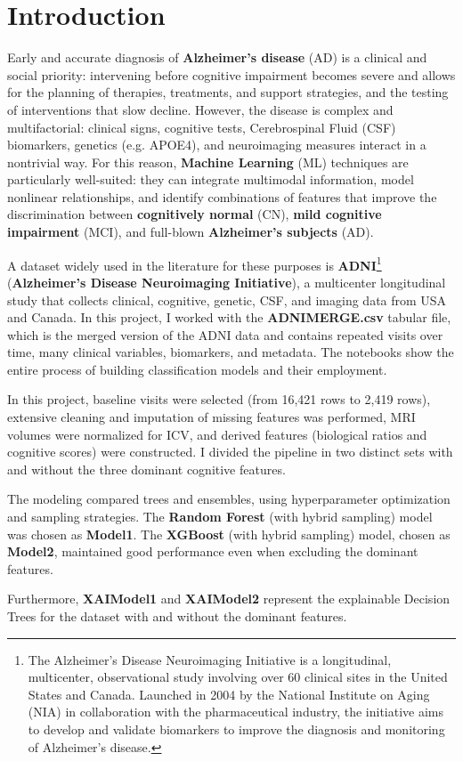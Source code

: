 \section{Introduction}
Early and accurate diagnosis of \textbf{Alzheimer's disease} (AD) is a clinical and social priority: intervening before cognitive impairment becomes severe and allows for the planning of therapies, treatments, and support strategies, and the testing of interventions that slow decline. However, the disease is complex and multifactorial: clinical signs, cognitive tests, Cerebrospinal Fluid (CSF) biomarkers, genetics (e.g. APOE4), and neuroimaging measures interact in a nontrivial way. For this reason, \textbf{Machine Learning} (ML) techniques are particularly well-suited: they can integrate multimodal information, model nonlinear relationships, and identify combinations of features that improve the discrimination between \textbf{cognitively normal} (CN), \textbf{mild cognitive impairment} (MCI), and full-blown \textbf{Alzheimer's subjects} (AD).

A dataset widely used in the literature for these purposes is \textbf{ADNI}\footnote{The Alzheimer's Disease Neuroimaging Initiative is a longitudinal, multicenter, observational study involving over 60 clinical sites in the United States and Canada. Launched in 2004 by the National Institute on Aging (NIA) in collaboration with the pharmaceutical industry, the initiative aims to develop and validate biomarkers to improve the diagnosis and monitoring of Alzheimer's disease.} (\textbf{Alzheimer's Disease Neuroimaging Initiative}), a multicenter longitudinal study that collects clinical, cognitive, genetic, CSF, and imaging data from USA and Canada. In this project, I worked with the \textbf{ADNIMERGE.csv} tabular file, which is the merged version of the ADNI data and contains repeated visits over time, many clinical variables, biomarkers, and metadata. The notebooks show the entire process of building classification models and their employment.

In this project, baseline visits were selected (from 16,421 rows to 2,419 rows), extensive cleaning and imputation of missing features was performed, MRI volumes were normalized for ICV, and derived features (biological ratios and cognitive scores) were constructed. I divided the pipeline in two distinct sets with and without the three dominant cognitive features.

The modeling compared trees and ensembles, using hyperparameter optimization and sampling strategies. The \textbf{Random Forest} (with hybrid sampling) model was chosen as \textbf{Model1}. The \textbf{XGBoost} (with hybrid sampling) model, chosen as \textbf{Model2}, maintained good performance even when excluding the dominant features. 

Furthermore, \textbf{XAIModel1} and \textbf{XAIModel2} represent the explainable Decision Trees for the dataset with and without the dominant features.




